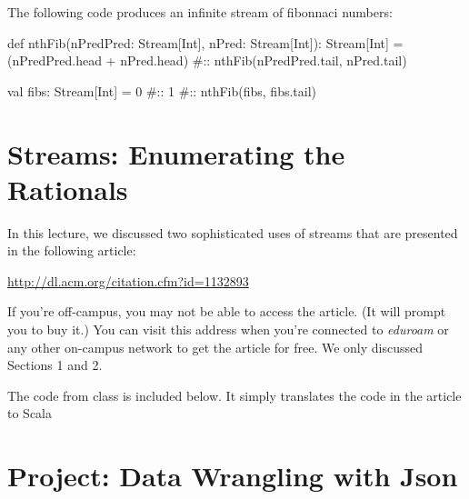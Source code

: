 \documentclass[9pt]{extbook}
\begin{document}
The following code produces an infinite stream of fibonnaci numbers:

\begin{scalacode}
def nthFib(nPredPred: Stream[Int], nPred: Stream[Int]): Stream[Int] = {
  (nPredPred.head + nPred.head) #:: nthFib(nPredPred.tail, nPred.tail)
}

val fibs: Stream[Int] = 0 #:: 1 #:: nthFib(fibs, fibs.tail)
\end{scalacode}

\chapter{Streams: Enumerating the Rationals}

In this lecture, we discussed two sophisticated uses of streams that are presented in the following
article:

\href{http://dl.acm.org/citation.cfm?id=1132893}{http://dl.acm.org/citation.cfm?id=1132893}

If you're off-campus, you may not be able to access the article. (It will prompt you to buy it.) You can visit this address
when you're connected to \emph{eduroam} or any other on-campus network to get the article for free. We only discussed Sections 1 and 2.

The code from class is included below. It simply translates the code in the article to Scala



































\chapter{Project: Data Wrangling with Json}
\end{document}
